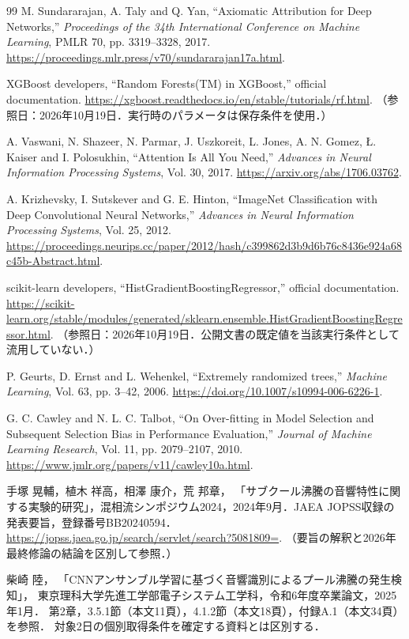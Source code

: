 \begin{thebibliography}{99}
M. Sundararajan, A. Taly and Q. Yan,
``Axiomatic Attribution for Deep Networks,''
\textit{Proceedings of the 34th International Conference on Machine Learning},
PMLR 70, pp. 3319--3328, 2017.
\url{https://proceedings.mlr.press/v70/sundararajan17a.html}.

XGBoost developers, ``Random Forests(TM) in XGBoost,'' official documentation.
\url{https://xgboost.readthedocs.io/en/stable/tutorials/rf.html}.
（参照日：2026年10月19日．実行時のパラメータは保存条件を使用．）

A. Vaswani, N. Shazeer, N. Parmar, J. Uszkoreit, L. Jones, A. N. Gomez, Ł. Kaiser and I. Polosukhin,
``Attention Is All You Need,'' \textit{Advances in Neural Information Processing Systems}, Vol. 30, 2017.
\url{https://arxiv.org/abs/1706.03762}.

A. Krizhevsky, I. Sutskever and G. E. Hinton,
``ImageNet Classification with Deep Convolutional Neural Networks,''
\textit{Advances in Neural Information Processing Systems}, Vol. 25, 2012.
\url{https://proceedings.neurips.cc/paper/2012/hash/c399862d3b9d6b76c8436e924a68c45b-Abstract.html}.

scikit-learn developers, ``HistGradientBoostingRegressor,'' official documentation.
\url{https://scikit-learn.org/stable/modules/generated/sklearn.ensemble.HistGradientBoostingRegressor.html}.
（参照日：2026年10月19日．公開文書の既定値を当該実行条件として流用していない．）

P. Geurts, D. Ernst and L. Wehenkel,
``Extremely randomized trees,'' \textit{Machine Learning}, Vol. 63, pp. 3--42, 2006.
\url{https://doi.org/10.1007/s10994-006-6226-1}.

G. C. Cawley and N. L. C. Talbot,
``On Over-fitting in Model Selection and Subsequent Selection Bias in Performance Evaluation,''
\textit{Journal of Machine Learning Research}, Vol. 11, pp. 2079--2107, 2010.
\url{https://www.jmlr.org/papers/v11/cawley10a.html}.

手塚 晃輔，植木 祥高，相澤 康介，荒 邦章，
「サブクール沸騰の音響特性に関する実験的研究」，混相流シンポジウム2024，2024年9月．JAEA JOPSS収録の発表要旨，登録番号BB20240594．
\url{https://jopss.jaea.go.jp/search/servlet/search?5081809=}.
（要旨の解釈と2026年最終修論の結論を区別して参照．）

柴崎 陸，
「CNNアンサンブル学習に基づく音響識別によるプール沸騰の発生検知」，
東京理科大学先進工学部電子システム工学科，令和6年度卒業論文，2025年1月．
第2章，3.5.1節（本文11頁），4.1.2節（本文18頁），付録A.1（本文34頁）を参照．
対象2日の個別取得条件を確定する資料とは区別する．


\end{thebibliography}
